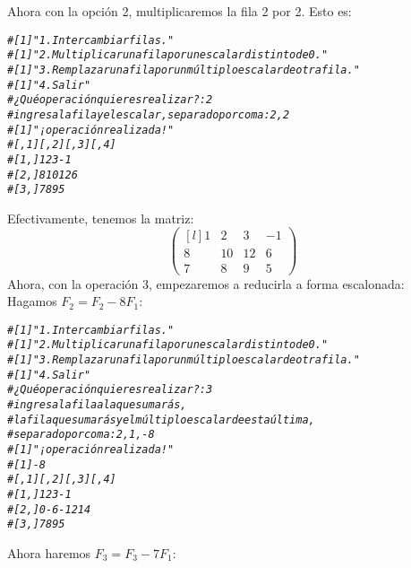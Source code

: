 \documentclass{article}\usepackage[]{graphicx}\usepackage[]{color}
\makeatletter
\newcommand{\hlcom}[1]{\textcolor[rgb]{0.678,0.584,0.686}{\textit{#1}}}%
\newenvironment{kframe}{%
 \def\at@end@of@kframe{}%
 \ifinner\ifhmode%
  \def\at@end@of@kframe{\end{minipage}}%
  \begin{minipage}{\columnwidth}%
 \fi\fi%
 \def\FrameCommand##1{\hskip\@totalleftmargin \hskip-\fboxsep
 \colorbox{shadecolor}{##1}\hskip-\fboxsep
     \hskip-\linewidth \hskip-\@totalleftmargin \hskip\columnwidth}%
 \MakeFramed {\advance\hsize-\width
   \@totalleftmargin\z@ \linewidth\hsize
   \@setminipage}}%
 {\par\unskip\endMakeFramed%
 \at@end@of@kframe}
\newenvironment{knitrout}{}{} %
\makeatother
\begin{document}
Ahora con la opción 2, multiplicaremos la fila 2 por 2. Esto es:
\begin{knitrout}
\color{fgcolor}\begin{kframe}
\begin{alltt}
\hlcom{# [1] "1. Intercambiar filas."}
\hlcom{# [1] "2. Multiplicar una fila por un escalar distinto de 0."}
\hlcom{# [1] "3. Remplazar una fila por un múltiplo escalar de otra fila."}
\hlcom{# [1] "4. Salir"}
\hlcom{# ¿Qué operación quieres realizar?:2}
\hlcom{# ingresa la fila  y el escalar, separado por coma:2,2}
\hlcom{# [1] "¡operación realizada!"}
\hlcom{#      [,1] [,2] [,3] [,4]}
\hlcom{# [1,]    1    2    3   -1}
\hlcom{# [2,]    8   10   12    6}
\hlcom{# [3,]    7    8    9    5}
\end{alltt}
\end{kframe}
\end{knitrout}
Efectivamente, tenemos la matriz:
\begin{equation*}
\begin{pmatrix*}[l]
1 & 2 & 3 & -1\\
8 & 10 & 12 & 6\\
7 & 8 & 9 & 5
\end{pmatrix*}
\end{equation*}
 Ahora, con la operación 3, empezaremos a reducirla a forma escalonada:
 Hagamos $F_2 = F_2 -8F_1$:
\begin{knitrout}
\color{fgcolor}\begin{kframe}
\begin{alltt}
\hlcom{# [1] "1. Intercambiar filas."}
\hlcom{# [1] "2. Multiplicar una fila por un escalar distinto de 0."}
\hlcom{# [1] "3. Remplazar una fila por un múltiplo escalar de otra fila."}
\hlcom{# [1] "4. Salir"}
\hlcom{# ¿Qué operación quieres realizar?:3}
\hlcom{# ingresa la fila a la que sumarás,}
\hlcom{#                    la fila que sumarás y el múltiplo escalar de esta última,}
\hlcom{#                    separado por coma:2,1,-8}
\hlcom{# [1] "¡operación realizada!"}
\hlcom{# [1] -8}
\hlcom{#      [,1] [,2] [,3] [,4]}
\hlcom{# [1,]    1    2    3   -1}
\hlcom{# [2,]    0   -6  -12   14}
\hlcom{# [3,]    7    8    9    5}
\end{alltt}
\end{kframe}
\end{knitrout}
Ahora haremos $F_3 = F_3 - 7F_1$:
\end{document}
